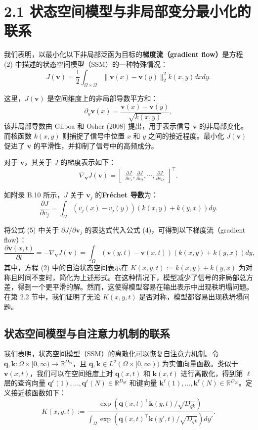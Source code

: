 \documentclass[lang=cn,a4paper,newtx]{elegantpaper}
\begin{document}
\section*{2.1 状态空间模型与非局部变分最小化的联系}

我们表明，以最小化以下非局部泛函为目标的\textbf{梯度流（gradient flow）}是方程 (2) 中描述的状态空间模型（SSM）的一种特殊情况：
\[
J(\mathbf{v}) = \frac{1}{2} \int_{\Omega \times \Omega} 
\|\mathbf{v}(x) - \mathbf{v}(y)\|_2^2 k(x, y) dx dy. \tag{3}
\]

这里，$J(\mathbf{v})$ 是空间维度上的非局部导数平方和：
\[
\partial_y \mathbf{v}(x) = \frac{\mathbf{v}(x) - \mathbf{v}(y)}{\sqrt{k(x, y)}}, 
\]
该非局部导数由 Gilboa 和 Osher (2008) 提出，用于表示信号 $\mathbf{v}$ 的非局部变化。而核函数 $k(x, y)$ 则捕捉了信号中位置 $x$ 和 $y$ 之间的接近程度。最小化 $J(\mathbf{v})$ 促进了 $\mathbf{v}$ 的平滑性，并抑制了信号中的高频成分。

对于 $\mathbf{v}$，其关于 $J$ 的梯度表示如下：
\[
\nabla_{\mathbf{v}} J(\mathbf{v}) = 
\begin{bmatrix}
\frac{\partial J}{\partial v_1}, \frac{\partial J}{\partial v_2}, \cdots, \frac{\partial J}{\partial v_D}
\end{bmatrix}^\top. \tag{4}
\]

如附录 B.10 所示，$J$ 关于 $\mathbf{v}_j$ 的\textbf{Fréchet 导数}为：
\[
\frac{\partial J}{\partial v_j} = 
\int_{\Omega} 
\left( v_j(x) - v_j(y) \right) \left( k(x, y) + k(y, x) \right) dy. \tag{5}
\]

将公式 (5) 中关于 $\partial J / \partial \mathbf{v}_j$ 的表达式代入公式 (4)，可得到以下梯度流（gradient flow）：
\[
\frac{\partial \mathbf{v}(x, t)}{\partial t} = -\nabla_{\mathbf{v}} J(\mathbf{v})
= \int_\Omega (\mathbf{v}(y, t) - \mathbf{v}(x, t))(k(x, y) + k(y, x)) dy, \tag{6}
\]
其中，方程 (2) 中的自治状态空间表示在 $K(x, y, t) := k(x, y) + k(y, x)$ 为对称且时间不变时，简化为上述形式。在这种情况下，模型减少了信号的非局部总方差，得到一个更平滑的解。然而，这使得模型容易在输出表示中出现秩坍塌问题。在第 2.2 节中，我们证明了无论 $K(x, y, t)$ 是否对称，模型都容易出现秩坍塌问题。

\subsection*{状态空间模型与自注意力机制的联系}
我们表明，状态空间模型（SSM）的离散化可以恢复自注意力机制。令 $\mathbf{q}, \mathbf{k} : \Omega \times [0, \infty) \to \mathbb{R}^{D_{qk}}$，且 $\mathbf{q}, \mathbf{k} \in L^2(\Omega \times [0, \infty))$ 为实值向量函数。类似于 $\mathbf{v}(x, t)$，我们可以在空间维度上对 $\mathbf{q}(x, t)$ 和 $\mathbf{k}(x, t)$ 进行离散化，得到第 $\ell$ 层的查询向量 $\mathbf{q}^\ell(1), \dots, \mathbf{q}^\ell(N) \in \mathbb{R}^{D_{qk}}$ 和键向量 $\mathbf{k}^\ell(1), \dots, \mathbf{k}^\ell(N) \in \mathbb{R}^{D_{qk}}$。定义接近核函数如下：
\[
K(x, y, t) := \frac{\exp(\mathbf{q}(x, t)^\top \mathbf{k}(y, t)/\sqrt{D_{qk}})}
{\int_\Omega \exp(\mathbf{q}(x, t)^\top \mathbf{k}(y', t)/\sqrt{D_{qk}}) dy'}.
\]
\end{document}
